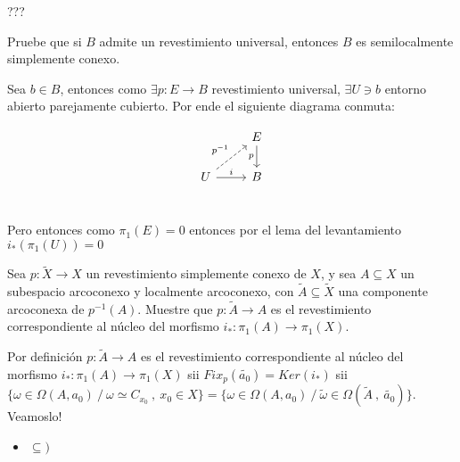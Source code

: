 \documentclass[11pt]{article}
\newcommand{\sett}[1]{\{#1\}}
\newenvironment{proof}[1][Demostraci\'on]{\begin{trivlist}
\item[\hskip \labelsep {\bfseries #1}]}{\end{trivlist}}
\newcommand{\qed}{\nobreak \ifvmode \relax \else
      \ifdim\lastskip<1.5em \hskip-\lastskip
      \hskip1.5em plus0em minus0.5em \fi \nobreak
      \vrule height0.75em width0.5em depth0.25em\fi}
\begin{document}
\begin{enumerate}
\begin{proof}

???

\end{proof}

\item{
Pruebe que si $B$ admite un revestimiento universal, entonces $B$ es semilocalmente simplemente conexo.
}

\begin{proof}

Sea $b \in B$, entonces como $\exists p:E \rightarrow B$ revestimiento universal, $\exists U \ni b$ entorno abierto parejamente cubierto. Por ende el siguiente diagrama conmuta:

\[
\begin{tikzcd}
& E \arrow[swap]{d}{p} \\
U \arrow{r}{i} \arrow[dashed]{ur}{p^{-1}} & B \\
\end{tikzcd}
\]

Pero entonces como $\pi_1(E)=0$ entonces por el lema del levantamiento $i_*(\pi_1(U))=0$ \qed

\end{proof}

\item {Sea $p:\tilde{X}\rightarrow X$ un revestimiento simplemente conexo de $X$, y sea $A\subseteq X$ un subespacio arcoconexo y localmente arcoconexo, con $\tilde{A}\subseteq \tilde{X}$ una componente arcoconexa de $p^{-1}(A)$. Muestre que $p:\tilde{A}\rightarrow A$ es el revestimiento correspondiente al n\'ucleo del morfismo $i_*:\pi_1(A)\rightarrow \pi_1(X)$.}

\begin{proof}

Por definici\'on $p:\tilde{A}\rightarrow A$ es el revestimiento correspondiente al n\'ucleo del morfismo $i_*:\pi_1(A)\rightarrow \pi_1(X)$ sii $Fix_p(\widetilde{a_0})=\textit{Ker}(i_*)$ sii $\sett{\omega \in \Omega(A,a_0) \ / \ \omega \simeq C_{x_0} \ , \ x_0 \in X} = \sett{\omega \in \Omega(A,a_0) \ / \  \widetilde{\omega} \in \Omega(\tilde{A} \ , \ \widetilde{a_0})}$. Veamoslo!

\begin{itemize}

\item {$\subseteq)$}


\end{itemize}
\end{proof}
\end{enumerate}
\end{document}
